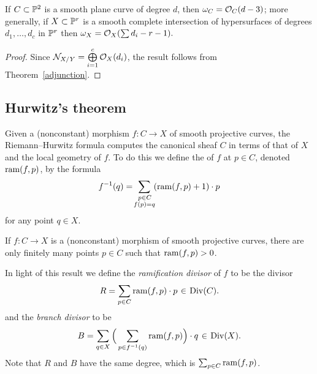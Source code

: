\begin{corollary}\label{canonical of plane curve}\label{canonical of complete intersection}
If $C\subset \mathbb P^{2}$ is a smooth plane curve of degree $d$, then
$\omega_{C} = {\mathcal O}_{C}(d-\nobreak 3)$; more generally, if
$X\subset \mathbb P^{r}$ is a smooth complete intersection of hypersurfaces of degrees $d_{1},\dots, d_{c}$ in $\mathbb P^r$ then
$\omega_{X} = {\mathcal O}_{X}(\sum d_{i }-r-1).$
\vspace*{-3pt}
\end{corollary}

\begin{proof}
Since ${\mathcal N}_{X/Y} = \bigoplus\limits_{i=1}^{c} {\mathcal O}_{X}(d_{i})$, the result follows from Theorem~\ref{adjunction}.
\end{proof}

\subsection*{Hurwitz's theorem}
 Given a (nonconstant) morphism $f : C \to X$ of smooth projective
 curves, the Riemann--Hurwitz formula computes the canonical sheaf
 $C$ in terms of that of  $X$ and the local geometry of $f$. To do
 this we define the
%
%
%
%
of $f$ at $p \in C$,  denoted $\operatorname{ram}(f,p)$, 
by the formula 
$$
 f^{-1}(q) = \!\sum_{\substack{\kern1ptp\in C\\ f(p)=q}}\! (\operatorname{ram}(f,p)+1)\cdot p
 $$
 for any point $q \in X$. 

\begin{proposition}
If $f : C \to X$ is a (nonconstant) morphism  of smooth projective curves,
there are only finitely many
points $p\in C$ such that $\operatorname{ram}(f,p)>0$.
\end{proposition}

In light of this result we define the \emph{ramification divisor}
% 
of $f$ to be the divisor
 $$
 R = \sum_{p \in C} \ram(f,p)\cdot p \; \in \;  \Div(C).
 $$
 and the \emph{branch divisor} to be
 $$
 B = \sum_{q \in X} \Big(\sum_{p \in f^{-1}(q)} \ram(f,p) \Big)\cdot q \; \in \; \Div(X).
 $$
Note that $R$ and $B$ have the same degree, which is $\sum_{p \in C} \operatorname{ram}(f,p)$.

